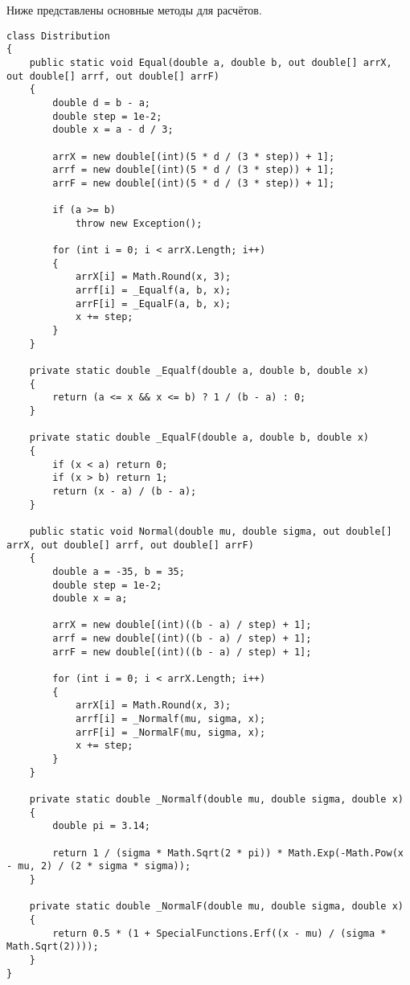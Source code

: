 Ниже представлены основные методы для расчётов.

\begin{lstlisting}
class Distribution
{
	public static void Equal(double a, double b, out double[] arrX, out double[] arrf, out double[] arrF)
	{
		double d = b - a;
		double step = 1e-2;
		double x = a - d / 3;
		
		arrX = new double[(int)(5 * d / (3 * step)) + 1];
		arrf = new double[(int)(5 * d / (3 * step)) + 1];
		arrF = new double[(int)(5 * d / (3 * step)) + 1];
		
		if (a >= b)
			throw new Exception();
		
		for (int i = 0; i < arrX.Length; i++)
		{
			arrX[i] = Math.Round(x, 3);
			arrf[i] = _Equalf(a, b, x);
			arrF[i] = _EqualF(a, b, x);
			x += step;
		}
	}
	
	private static double _Equalf(double a, double b, double x)
	{
		return (a <= x && x <= b) ? 1 / (b - a) : 0;
	}
	
	private static double _EqualF(double a, double b, double x)
	{
		if (x < a) return 0;
		if (x > b) return 1;
		return (x - a) / (b - a);
	}
	
	public static void Normal(double mu, double sigma, out double[] arrX, out double[] arrf, out double[] arrF)
	{
		double a = -35, b = 35;
		double step = 1e-2;
		double x = a;
		
		arrX = new double[(int)((b - a) / step) + 1];
		arrf = new double[(int)((b - a) / step) + 1];
		arrF = new double[(int)((b - a) / step) + 1];
		
		for (int i = 0; i < arrX.Length; i++)
		{
			arrX[i] = Math.Round(x, 3);
			arrf[i] = _Normalf(mu, sigma, x);
			arrF[i] = _NormalF(mu, sigma, x);
			x += step;
		}
	}
	
	private static double _Normalf(double mu, double sigma, double x)
	{
		double pi = 3.14;
		
		return 1 / (sigma * Math.Sqrt(2 * pi)) * Math.Exp(-Math.Pow(x - mu, 2) / (2 * sigma * sigma));
	}
	
	private static double _NormalF(double mu, double sigma, double x)
	{
		return 0.5 * (1 + SpecialFunctions.Erf((x - mu) / (sigma * Math.Sqrt(2))));
	}
}
\end{lstlisting}